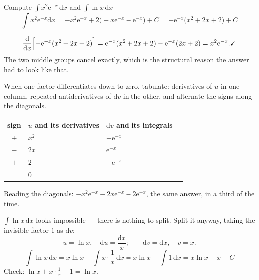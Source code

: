\begin{worked}{Compute $\displaystyle\int x^{2}\mathrm{e}^{-x}\,\mathrm{d}x$ and $\displaystyle\int\ln x\,\mathrm{d}x$}
\[
  \int x^{2}\mathrm{e}^{-x}\mathrm{d}x
  =-x^{2}\mathrm{e}^{-x}+2\bigl(-x\mathrm{e}^{-x}-\mathrm{e}^{-x}\bigr)+C
  =\boxed{-\mathrm{e}^{-x}\bigl(x^{2}+2x+2\bigr)+C}
\]

\[
  \frac{\mathrm{d}}{\mathrm{d}x}\Bigl[-\mathrm{e}^{-x}(x^{2}+2x+2)\Bigr]
  =\mathrm{e}^{-x}(x^{2}+2x+2)-\mathrm{e}^{-x}(2x+2)
  =x^{2}\mathrm{e}^{-x} . \checkmark
\]
The two middle groups cancel exactly, which is the structural reason the
answer had to look like that.

When one factor differentiates down to zero, tabulate: derivatives of $u$ in
one column, repeated antiderivatives of $\mathrm{d}v$ in the other, and
alternate the signs along the diagonals.
\begin{center}\footnotesize
\begin{tabular}{clll}
  \hline
  sign & $u$ and its derivatives & $\mathrm{d}v$ and its integrals\\
  \hline
  $+$ & $x^{2}$ & $-\mathrm{e}^{-x}$\\
  $-$ & $2x$ & $\mathrm{e}^{-x}$\\
  $+$ & $2$ & $-\mathrm{e}^{-x}$\\
   & $0$ & \\
  \hline
\end{tabular}
\end{center}
Reading the diagonals: $-x^{2}\mathrm{e}^{-x}-2x\mathrm{e}^{-x}
-2\mathrm{e}^{-x}$, the same answer, in a third of the time.

$\int\ln x\,\mathrm{d}x$ looks impossible --- there is nothing to split. Split
it anyway, taking the invisible factor $1$ as $\mathrm{d}v$:
\[
  u=\ln x,\quad \mathrm{d}u=\frac{\mathrm{d}x}{x};
  \qquad
  \mathrm{d}v=\mathrm{d}x,\quad v=x .
\]
\[
  \int\ln x\,\mathrm{d}x=x\ln x-\int x\cdot\frac1x\,\mathrm{d}x
  =x\ln x-\int1\,\mathrm{d}x
  =\boxed{x\ln x-x+C}
\]
Check: $\ln x+x\cdot\frac1x-1=\ln x$. \checkmark
{}


\end{worked}
